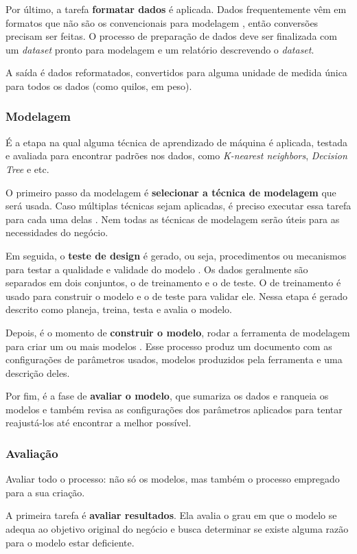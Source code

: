 Por último, a tarefa \textbf{formatar dados} é aplicada. Dados frequentemente vêm em formatos que não são os convencionais para modelagem \citep{dmfd}, então conversões precisam ser feitas. O processo de preparação de dados deve ser finalizada com um \textit{dataset} pronto para modelagem e um relatório descrevendo o \textit{dataset}.

A saída é dados reformatados, convertidos para alguma unidade de medida única para todos os dados (como quilos, em peso).

\subsubsection{Modelagem}
É a etapa na qual alguma técnica de aprendizado de máquina é aplicada, testada e avaliada para encontrar padrões nos dados, como \textit{K-nearest neighbors}, \textit{Decision Tree }e etc.

O primeiro passo da modelagem é \textbf{selecionar a técnica de modelagem} que será usada. Caso múltiplas técnicas sejam aplicadas, é preciso executar essa tarefa para cada uma delas \citep{crispmanual}. Nem todas as técnicas de modelagem serão úteis para as necessidades do negócio.

Em seguida, o \textbf{teste de design} é gerado, ou seja, procedimentos ou mecanismos para testar a qualidade e validade do modelo \citep{crispmanual}. Os dados geralmente são separados em dois conjuntos, o de treinamento e o de teste. O de treinamento é usado para construir o modelo e o de teste para validar ele. Nessa etapa é gerado descrito como planeja, treina, testa e avalia o modelo.

Depois, é o momento de \textbf{construir o modelo}, rodar a ferramenta de modelagem para criar um ou mais modelos \citep{crispmanual}. Esse processo produz um documento com as configurações de parâmetros usados, modelos produzidos pela ferramenta e uma descrição deles.

Por fim, é a fase de \textbf{avaliar o modelo}, que sumariza os dados e ranqueia os modelos e também revisa as configurações dos parâmetros aplicados para tentar reajustá-los até encontrar a melhor possível.

\subsubsection{Avaliação}
Avaliar todo o processo: não só os modelos, mas também o processo empregado para a sua criação.

A primeira tarefa é \textbf{avaliar resultados}. Ela avalia o grau em que o modelo se adequa ao objetivo original do negócio e busca determinar se existe alguma razão para o modelo estar deficiente.

